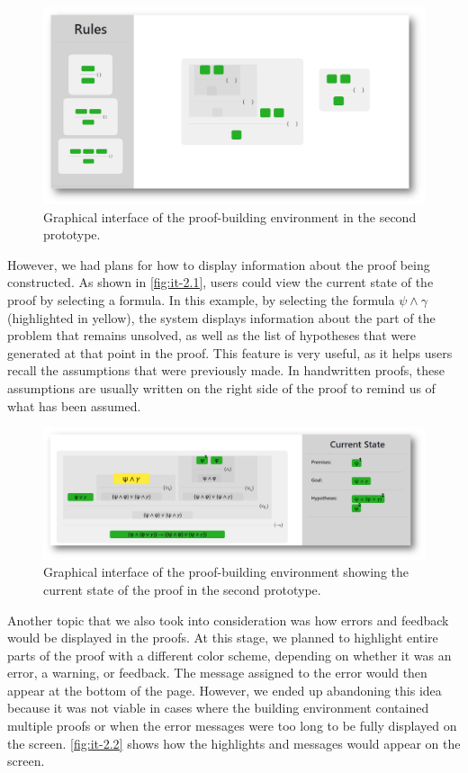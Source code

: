 \begin{figure}[h]
    \centering
    \includegraphics[width=0.95\linewidth]{Chapters/Figures/image3.png}
    \caption{Graphical interface of the proof-building environment in the second prototype.}
    \label{fig:it-2.1}
\end{figure}

However, we had plans for how to display information about the proof being constructed. As shown in \autoref{fig:it-2.1}, users could view the current state of the proof by selecting a formula. In this example, by selecting the formula $\psi \land \gamma$ (highlighted in yellow), the system displays information about the part of the problem that remains unsolved, as well as the list of hypotheses that were generated at that point in the proof. This feature is very useful, as it helps users recall the assumptions that were previously made. In handwritten proofs, these assumptions are usually written on the right side of the proof to remind us of what has been assumed.

\begin{figure}[h]
    \centering
    \includegraphics[width=0.95\linewidth]{Chapters/Figures/image4.png}
    \caption{Graphical interface of the proof-building environment showing the current state of the proof in the second prototype.}
    \label{fig:it-2.2}
\end{figure}

Another topic that we also took into consideration was how errors and feedback would be displayed in the proofs. At this stage, we planned to highlight entire parts of the proof with a different color scheme, depending on whether it was an error, a warning, or feedback. The message assigned to the error would then appear at the bottom of the page. However, we ended up abandoning this idea because it was not viable in cases where the building environment contained multiple proofs or when the error messages were too long to be fully displayed on the screen. \autoref{fig:it-2.2} shows how the highlights and messages would appear on the screen.

